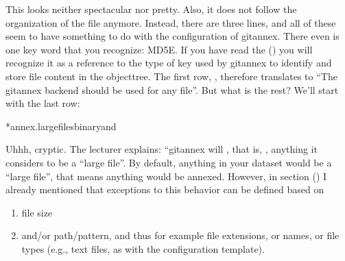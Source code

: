 \sphinxAtStartPar
This looks neither spectacular nor pretty. Also, it does not follow the 
organization of the  file anymore. Instead, there are three lines,
and all of these seem to have something to do with the configuration of git\sphinxhyphen{}annex.
There even is one key word that you recognize: MD5E.
If you have read the {\hyperref[\detokenize{basics/101-115-symlinks:objecttree}]{}} ()
you will recognize it as a reference to the type of
key used by git\sphinxhyphen{}annex to identify and store file content in the object\sphinxhyphen{}tree.
The first row, , therefore translates to “The  git\sphinxhyphen{}annex backend should be used for any file”.
But what is the rest? We’ll start with the last row:

\begin{sphinxVerbatim}[commandchars=\\\{\}]
*annex.largefilesbinaryand
\end{sphinxVerbatim}

\sphinxAtStartPar
Uhhh, cryptic. The lecturer explains: “git\sphinxhyphen{}annex will , that is, ,
anything it considers to be a “large file”. By default, anything
in your dataset would be a “large file”, that means anything would be annexed.
However, in section {\hyperref[\detokenize{basics/101-115-symlinks:symlink}]{}} () I already mentioned that exceptions to this
behavior can be defined based on
\begin{enumerate}
%
\item {} 
\sphinxAtStartPar
file size

\item {} 
\sphinxAtStartPar
and/or path/pattern, and thus for example file extensions,
or names, or file types (e.g., text files, as with the
 configuration template).

\end{enumerate}

